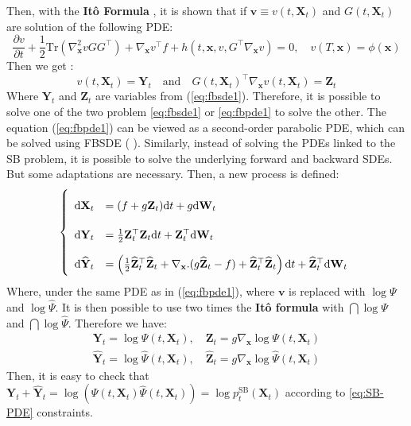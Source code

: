 \documentclass{article}
\begin{document}
Then, with the \textbf{Itô Formula} \cite{EXARCHOS2018159}, it is shown that if $\mathbf{v} \equiv v(t,\mathbf{X}_t)$ and $G(t,\mathbf{X}_t)$ are solution of the following PDE:
\begin{equation}\label{eq:fbpde1}
\frac{\partial v}{\partial t} + \frac{1}{2}\mathrm{Tr}(\nabla_\mathbf{x}^2 vGG^\top) + \nabla_\mathbf{x}v^\top f + h(t,\mathbf{x},v,G^\top\nabla_\mathbf{x}v) = 0, \quad v(T,\mathbf{x}) = \phi(\mathbf{x})
\end{equation}
Then we get :
$$
v(t,\mathbf{X}_t) = \mathbf{Y}_t \quad \text{and} \quad G(t,\mathbf{X}_t)^\top \nabla_\mathbf{x}v(t,\mathbf{X}_t) = \mathbf{Z}_t
$$
Where $\mathbf{Y}_t$ and $\mathbf{Z}_t$ are variables from (\ref{eq:fbsde1}). Therefore, it is possible to solve one of the two problem \ref{eq:fbsde1} or \ref{eq:fbpde1} to solve the other. The equation (\ref{eq:fbpde1}) can be viewed as a second-order parabolic PDE, which can be solved using FBSDE (\citeauthor{pmlr-v120-pereira20a} \citeyear{pmlr-v120-pereira20a}). Similarly, instead of solving the PDEs linked to the SB problem, it is possible to solve the underlying forward and backward SDEs. But some adaptations are necessary. Then, a new process is defined:
\begin{equation}\label{eq:newFBSDE}
\def\arraystretch{2.2}
\left\{\begin{array}{ll}
\dint\mathbf{X}_t & = (f+g\mathbf{Z}_t) \dint t + g \dint \mathbf{W}_t  \\
  \dint\mathbf{Y}_t & = \frac{1}{2}\mathbf{Z}_t^\top\mathbf{Z}_t\dint t + \mathbf{Z}_t^\top\dint\mathbf{W}_t \\
  \dint\widehat{\mathbf{Y}}_t & = \pars{\frac{1}{2}\widehat{\mathbf{Z}}_t^\top\widehat{\mathbf{Z}}_t + \nabla_\mathbf{x} . (g\widehat{\mathbf{Z}}_t - f) + \widehat{\mathbf{Z}}_t^\top\widehat{\mathbf{Z}}_t} \dint t + \widehat{\mathbf{Z}}_t^\top\dint\mathbf{W}_t
\end{array}\right.
\end{equation}
Where, under the same PDE as in (\ref{eq:fbpde1}), where $\mathbf{v}$ is replaced with $\log \Psi$ and $\log\widehat\Psi$. It is then possible to use two times the \textbf{Itô formula} with $\dint \log \Psi$ and $\dint \log\widehat\Psi$. Therefore we have:
$$
\begin{aligned}
    \mathbf{Y}_t = \log\Psi(t,\mathbf{X}_t), \quad \mathbf{Z}_t = g \nabla_\mathbf{x}\log \Psi(t,\mathbf{X}_t)\\
    \widehat{\mathbf{Y}}_t = \log\widehat\Psi(t,\mathbf{X}_t), \quad \widehat{\mathbf{Z}}_t = g\nabla_\mathbf{x}\log\widehat\Psi(t,\mathbf{X}_t)
\end{aligned}
$$
Then, it is easy to check that $\mathbf{Y}_t + \widehat{\mathbf{Y}}_t = \log(\Psi(t,\mathbf{X}_t)\widehat\Psi(t,\mathbf{X}_t)) = \log p_t^\mathrm{SB}(\mathbf{X}_t)$ according to \ref{eq:SB-PDE} constraints.
\end{document}

